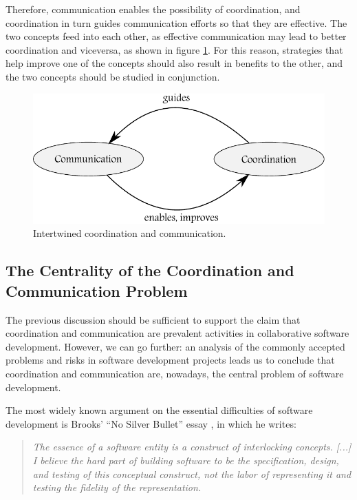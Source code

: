Therefore, communication enables the possibility of coordination, and coordination in turn guides communication efforts so that they are effective. The two concepts feed into each other, as effective communication may lead to better coordination and viceversa, as shown in figure \ref{fig:CommCoord}. For this reason, strategies that help improve one of the concepts should also result in benefits to the other, and the two concepts should be studied in conjunction.

\begin{figure}[tb]
\centering
\includegraphics[scale=1.0]{commcoord}
\caption{\label{fig:CommCoord}Intertwined coordination and communication.}
\end{figure}


\subsection{The Centrality of the Coordination and Communication Problem}
\label{sec:Centrality}

The previous discussion should be sufficient to support the claim that coordination and communication are prevalent activities in collaborative software development. However, we can go further: an analysis of the commonly accepted problems and risks in software development projects leads us to conclude that coordination and communication are, nowadays, the central problem of software development.

The most widely known argument on the essential difficulties of software development is Brooks' ``No Silver Bullet'' essay , in which he writes:

\begin{quote}
\emph{The essence of a software entity is a construct of interlocking concepts. [...] I believe the hard part of building software to be the specification, design, and testing of this conceptual construct, not the labor of representing it and testing the fidelity of the representation.}
\end{quote}

